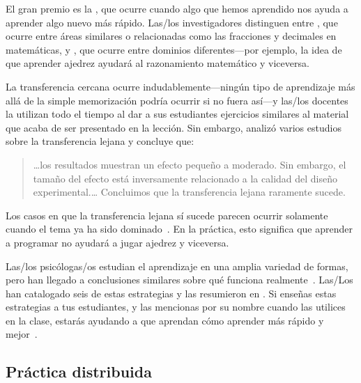 El gran premio es la ,
que ocurre cuando algo que hemos aprendido nos ayuda a aprender algo nuevo más rápido.
Las/los investigadores distinguen entre ,
que ocurre entre áreas similares o relacionadas como las fracciones y decimales en matemáticas,
y ,
que ocurre entre dominios diferentes---por ejemplo,
la idea de que aprender ajedrez ayudará al razonamiento matemático y viceversa.

La transferencia cercana ocurre indudablemente---ningún tipo de aprendizaje
más allá de la simple memorización podría ocurrir si no fuera así---y
las/los docentes la utilizan todo el tiempo
al dar a sus estudiantes ejercicios similares al material que acaba de ser presentado en la lección.
Sin embargo,
\cite{Sala2017} analizó varios estudios sobre la transferencia lejana
y concluye que:

\begin{quote}

  {\ldots}los resultados muestran un efecto pequeño a moderado.
  Sin embargo, el tamaño del efecto está inversamente relacionado a la calidad del diseño experimental.{\ldots}
  Concluimos que la transferencia lejana raramente sucede.

\end{quote}

Los casos en que la transferencia lejana sí sucede
parecen ocurrir solamente cuando el tema ya ha sido dominado~\cite{Gick1987}.
En la práctica,
esto significa que aprender a programar no ayudará a jugar ajedrez y viceversa.


Las/los psicólogas/os estudian el aprendizaje en una amplia variedad de formas,
pero han llegado a conclusiones similares sobre qué funciona realmente~\cite{Mark2018}.
Las/Los 
han catalogado seis de estas estrategias y
las resumieron en .
Si enseñas estas estrategias a tus estudiantes,
y las mencionas por su nombre cuando las utilices en la clase,
estarás ayudando a que aprendan cómo aprender más rápido y mejor~\cite{Wein2018a,Wein2018b}.

\subsection*{Práctica distribuida}


